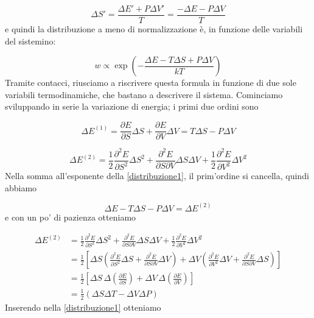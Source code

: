 \documentclass[a4paper]{report}
\begin{document}
\begin{equation}
    \Delta S' = \frac{\Delta E' + P \Delta V'}{T} = \frac{- \Delta E - P \Delta V}{T}
\end{equation}
e quindi la distribuzione a meno di normalizzazione è, in funzione delle variabili del sistemino:

\begin{equation}
    w \propto \exp\left(-\frac{\Delta E - T \Delta S + P \Delta V}{k T}\right)
    \label{distribuzione1}
\end{equation}
Tramite contacci, riusciamo a riscrivere questa formula in funzione di due sole variabili termodinamiche, che bastano a descrivere il sistema. Cominciamo sviluppando in serie la variazione di energia; i primi due ordini sono

\begin{equation}
    \Delta E^{(1)} = \frac{\partial E}{\partial S} \Delta S + \frac{\partial E}{\partial V} \Delta V = T \Delta S - P \Delta V
\end{equation}

\begin{equation}
    \Delta E^{(2)} = \frac{1}{2}\frac{\partial^2 E}{\partial S^2} \Delta S^2 + \frac{\partial^2 E}{\partial S \partial V} \Delta S \Delta V + \frac{1}{2}\frac{\partial^2 E}{\partial V^2} \Delta V^2
\end{equation}
Nella somma all'esponente della \eqref{distribuzione1}, il prim'ordine si cancella, quindi abbiamo

\begin{equation}
    \Delta E - T \Delta S - P \Delta V = \Delta E^{(2)}
\end{equation}
e con un po' di pazienza otteniamo

\begin{equation}
    \begin{split}
        \Delta E^{(2)} & = \frac{1}{2}\frac{\partial^2 E}{\partial S^2} \Delta S^2 + \frac{\partial^2 E}{\partial S \partial V} \Delta S \Delta V + \frac{1}{2}\frac{\partial^2 E}{\partial V^2} \Delta V^2 \\
        & = \frac{1}{2}\left[\Delta S \left( \frac{\partial^2 E}{\partial S^2} \Delta S  + \frac{\partial^2 E}{\partial S \partial V} \Delta V \right) + \Delta V  \left( \frac{\partial^2 E}{\partial V^2} \Delta V  + \frac{\partial^2 E}{\partial S \partial V} \Delta S \right)\right]  \\
        & = \frac{1}{2}\left[ \Delta S\,\Delta \left(\frac{\partial E}{\partial S}\right) + \Delta V \,\Delta\left(\frac{\partial E}{\partial V}\right)\right] \\
        & = \frac{1}{2}\left(\Delta S \Delta T - \Delta V \Delta P\right)
    \end{split}
\end{equation}
Inserendo nella \eqref{distribuzione1} otteniamo
\end{document}
